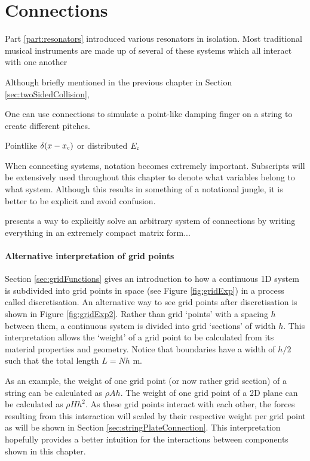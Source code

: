 \chapter{Connections}\label{ch:connections}
Part \ref{part:resonators} introduced various resonators in isolation. Most traditional musical instruments are made up of several of these systems which all interact with one another

Although briefly mentioned in the previous chapter in Section \ref{sec:twoSidedCollision}, 

One can use connections to simulate a point-like damping finger on a string to create different pitches.

Pointlike $\delta(x-x_{\text{c}})$ or distributed $E_{\text{c}}$

When connecting systems, notation becomes extremely important. Subscripts will be extensively used throughout this chapter to denote what variables belong to what system. Although this results in something of a notational jungle, it is better to be explicit and avoid confusion. 

\cite{Bilbao2009Modular} presents a way to explicitly solve an arbitrary system of connections by writing everything in an extremely compact matrix form... 

\subsubsection{Alternative interpretation of grid points}
Section \ref{sec:gridFunctions} gives an introduction to how a continuous 1D system is subdivided into grid points in space (see Figure \ref{fig:gridExp}) in a process called discretisation. An alternative way to see grid points after discretisation is shown in Figure \ref{fig:gridExp2}. Rather than grid `points' with a spacing $h$ between them, a continuous system is divided into grid `sections' of width $h$. This interpretation allows the `weight' of a grid point to be calculated from its material properties and geometry. Notice that boundaries have a width of $h/2$ such that the total length $L = Nh$ m.

As an example, the weight of one grid point (or now rather grid section) of a string can be calculated as $\rho A h$. The weight of one grid point of a 2D plane can be calculated as $\rho H h^2$. As these grid points interact with each other, the forces resulting from this interaction will scaled by their respective weight per grid point as will be shown in Section \ref{sec:stringPlateConnection}.
This interpretation hopefully provides a better intuition for the interactions between components shown in this chapter. 

